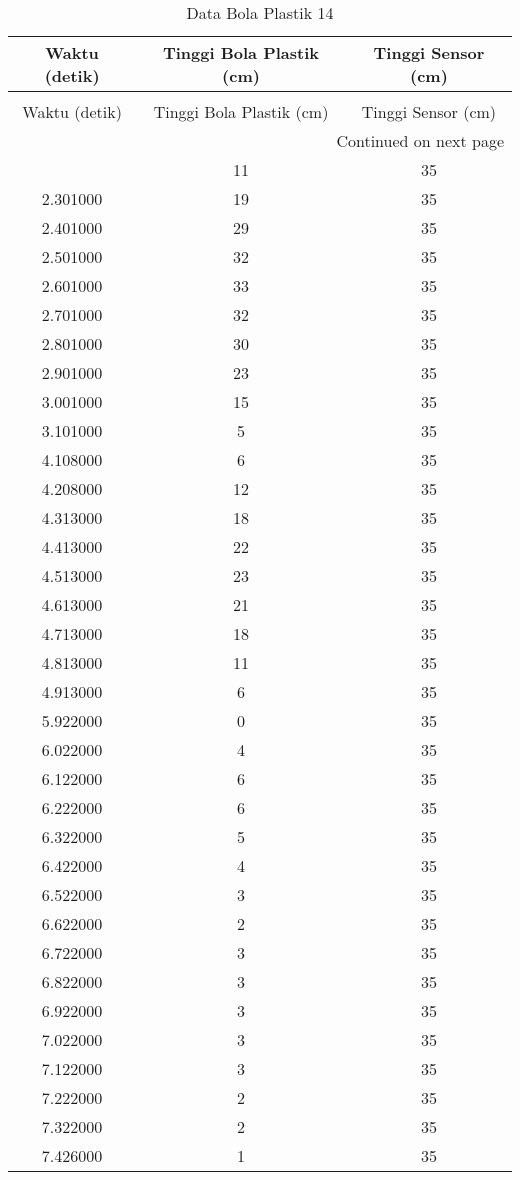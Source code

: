 \begin{longtable}[htbp]{|c|c|c|}
\caption{Data Bola Plastik 14} \\
\hline
Waktu (detik) & Tinggi Bola Plastik (cm) & Tinggi Sensor (cm) \\ \hline
\endfirsthead
\caption[]{Data Bola Plastik 14} \\
\hline
Waktu (detik) & Tinggi Bola Plastik (cm) & Tinggi Sensor (cm) \\ \hline
\endhead
\multicolumn{3}{r}{Continued on next page} \\
\endfoot
\endlastfoot
2.201000 & 11 & 35 \\ \hline
2.301000 & 19 & 35 \\ \hline
2.401000 & 29 & 35 \\ \hline
2.501000 & 32 & 35 \\ \hline
2.601000 & 33 & 35 \\ \hline
2.701000 & 32 & 35 \\ \hline
2.801000 & 30 & 35 \\ \hline
2.901000 & 23 & 35 \\ \hline
3.001000 & 15 & 35 \\ \hline
3.101000 & 5 & 35 \\ \hline
4.108000 & 6 & 35 \\ \hline
4.208000 & 12 & 35 \\ \hline
4.313000 & 18 & 35 \\ \hline
4.413000 & 22 & 35 \\ \hline
4.513000 & 23 & 35 \\ \hline
4.613000 & 21 & 35 \\ \hline
4.713000 & 18 & 35 \\ \hline
4.813000 & 11 & 35 \\ \hline
4.913000 & 6 & 35 \\ \hline
5.922000 & 0 & 35 \\ \hline
6.022000 & 4 & 35 \\ \hline
6.122000 & 6 & 35 \\ \hline
6.222000 & 6 & 35 \\ \hline
6.322000 & 5 & 35 \\ \hline
6.422000 & 4 & 35 \\ \hline
6.522000 & 3 & 35 \\ \hline
6.622000 & 2 & 35 \\ \hline
6.722000 & 3 & 35 \\ \hline
6.822000 & 3 & 35 \\ \hline
6.922000 & 3 & 35 \\ \hline
7.022000 & 3 & 35 \\ \hline
7.122000 & 3 & 35 \\ \hline
7.222000 & 2 & 35 \\ \hline
7.322000 & 2 & 35 \\ \hline
7.426000 & 1 & 35 \\ \hline
\end{longtable}
